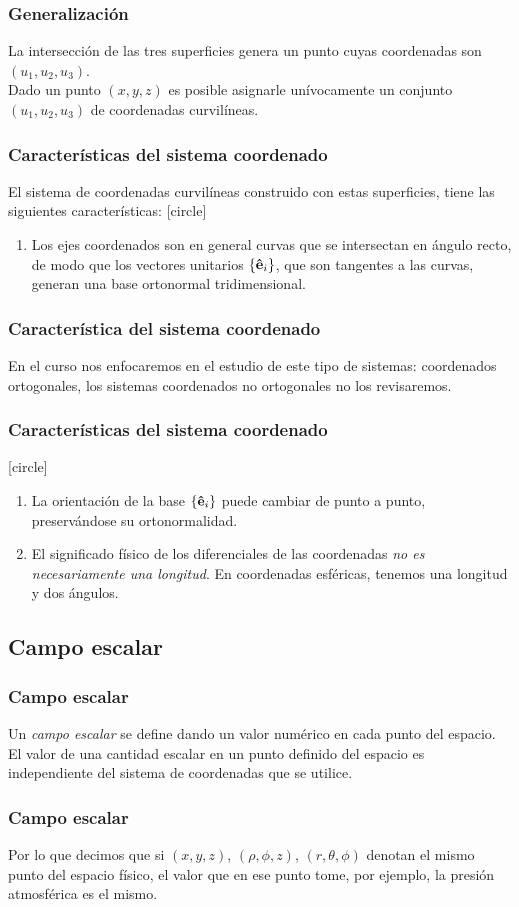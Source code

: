 \documentclass[12pt]{beamer}
\begin{document}
\begin{frame}
\frametitle{Generalización}   
La intersección de las tres superficies genera un punto cuyas coordenadas son $(u_{1}, u_{2}, u_{3})$.
\\
\bigskip
\pause
Dado un punto $(x, y, z)$ es posible asignarle unívocamente un conjunto $(u_{1}, u_{2}, u_{3})$ de coordenadas curvilíneas.
\end{frame}
\begin{frame}
\frametitle{Características del sistema coordenado}
El sistema de coordenadas curvilíneas construido con estas superficies, tiene las siguientes características:
\pause
{}
[circle]
\begin{enumerate}[<+->]
\item Los ejes coordenados son en general curvas que se intersectan en ángulo recto, de modo que los vectores unitarios $\left\{ \vu{e}_{i} \right\}$, que son tangentes a las curvas, generan una base ortonormal tridimensional.
\seti
\end{enumerate}
\end{frame}
\begin{frame}
\frametitle{Característica del sistema coordenado}
En el curso nos enfocaremos en el estudio de este tipo de sistemas: coordenados ortogonales, los sistemas coordenados no ortogonales no los revisaremos.
\end{frame}
\begin{frame}
\frametitle{Características del sistema coordenado}
[circle]
\begin{enumerate}[<+->]
\conti
\item La orientación de la base $\left\{ \vu{e}_{i} \right\}$ puede cambiar de punto a punto, preservándose su ortonormalidad.
\item El significado físico de los diferenciales de las coordenadas \emph{no es necesariamente una longitud}. En coordenadas esféricas, tenemos una longitud y dos ángulos.
\end{enumerate}
\end{frame}

\subsection*{Campo escalar}

\begin{frame}
\frametitle{Campo escalar}
Un \emph{campo escalar} se define dando un valor numérico en cada punto del espacio.
\\
\bigskip
\pause
El valor de una cantidad escalar en un punto definido del espacio es independiente
del sistema de coordenadas que se utilice.
\end{frame}
\begin{frame}
\frametitle{Campo escalar}
Por lo que decimos que si $(x, y, z)$, $(\rho, \phi, z)$, $(r, \theta, \phi)$ denotan el mismo punto del espacio físico, el valor que en ese punto tome, por ejemplo, la presión atmosférica es el mismo.
\end{frame}
\end{document}
